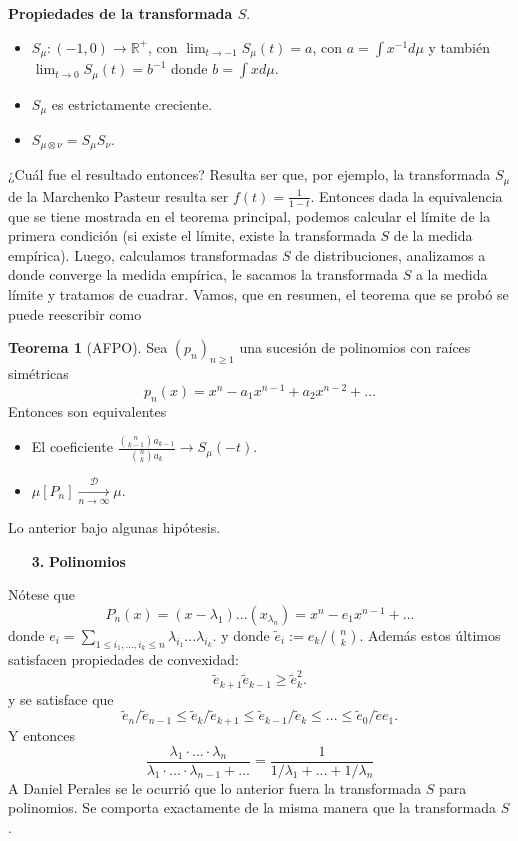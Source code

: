 \documentclass[letterpaper]{article}
\newcommand{\R}{\mathbb{R}}
\renewcommand{\to}{\rightarrow}
\newcommand{\1}{\mathds{1}}
\theoremstyle{definition}
\theoremstyle{definition}
\newtheorem{teo}{Teorema}
\theoremstyle{definition}
\theoremstyle{definition}
\theoremstyle{definition}
\begin{document}
\textbf{Propiedades de la transformada $S$}.
\begin{itemize}
    \item $S_\mu:(-1,0)\to\R^{+}$, con $\lim_{t\to-1}S_\mu(t)=a$, con $a=\int x^{-1}d\mu$ y también  $\lim_{t\to 0}S_\mu(t)=b^{-1}$ donde $b=\int x d\mu$.
    \item $S_\mu$ es estrictamente creciente.
    \item $S_{\mu\otimes\nu}=S_\mu S_\nu$.
\end{itemize}
¿Cuál fue el resultado entonces? Resulta ser que, por ejemplo, la transformada $S_\mu$ de la Marchenko Pasteur resulta ser $f(t)=\frac{1}{1-t}$. Entonces dada la equivalencia que se tiene mostrada en el teorema principal, podemos calcular el límite de la primera condición (si existe el límite, existe la transformada $S$ de la medida empírica). Luego, calculamos transformadas $S$ de distribuciones, analizamos a donde converge la medida empírica, le sacamos la transformada $S$ a la medida límite y tratamos de cuadrar. Vamos, que en resumen, el teorema que se probó se puede reescribir como 

\begin{teo}[AFPO]
    Sea $(p_n)_{n\geq1}$ una sucesión de polinomios con raíces simétricas 
    \[
    p_n(x)=x^n-a_1x^{n-1}+a_2x^{n-2}+...
    \] 
    Entonces son equivalentes
    \begin{itemize}
        \item El coeficiente $\frac{{n\choose k-1}a_{k-1}}{{n\choose k}a_k}\to S_\mu(-t)$. 
        \item $\mu[P_n]\xrightarrow[n\to \infty]{\mathcal{D}}\mu$.
    \end{itemize}
 \end{teo}
 Lo anterior bajo algunas hipótesis.
\begin{enumerate}
    \item[\textbf{3.}] \textbf{Polinomios} 
\end{enumerate}
Nótese que 
\[
P_n(x)=(x-\lambda_1)...(x_{\lambda_n})=x^n-e_1x^{n-1}+...
\]
donde $e_i=\sum_{1\leq i_1,...,i_k\leq n}\lambda_{i_1}...\lambda_{i_k}$.
y donde $\tilde{e}_i:=e_k/{n\choose k}$. Además estos últimos satisfacen propiedades de convexidad:
\[
\tilde{e}_{k+1}\tilde{e}_{k-1}\geq\tilde{e}_{k}^2.
\]
y se satisface que 
\[
\tilde{e}_n/\tilde{e}_{n-1}\leq \tilde{e}_{k}/\tilde{e}_{k+1}\leq\tilde{e}_{k-1}/\tilde{e}_{k}\leq...\leq\tilde{e}_0/\tilde{e}e_{1}.
\]
Y entonces 
\[
\frac{\lambda_1\cdot...\cdot\lambda_n}{\lambda_1\cdot...\cdot\lambda_{n-1}+...}=\frac{1}{1/\lambda_1+...+1/\lambda_{n}}
\]
A Daniel Perales se le ocurrió que lo anterior fuera la transformada $S$ para polinomios. Se comporta exactamente de la misma manera que la transformada $S$.
\end{document}
